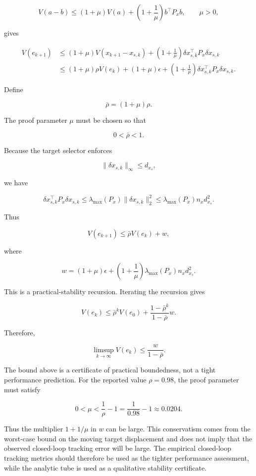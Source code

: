 \documentclass[11pt]{article}
\begin{document}
\[
V(a-b)
\le
(1+\mu)V(a)
+
\left(1+\frac{1}{\mu}\right)b^\top P_x b,
\qquad
\mu>0,
\]

gives


\[
\begin{aligned}
V(e_{k+1})
&\le
(1+\mu)V(x_{k+1}-x_{s,k})
+
\left(1+\frac{1}{\mu}\right)
\delta x_{s,k}^\top P_x \delta x_{s,k} \\
&\le
(1+\mu)\rho V(e_k)
+
(1+\mu)\epsilon
+
\left(1+\frac{1}{\mu}\right)
\delta x_{s,k}^\top P_x \delta x_{s,k}.
\end{aligned}
\]

Define


\[
\bar\rho=(1+\mu)\rho.
\]

The proof parameter $\mu$ must be chosen so that


\[
0<\bar\rho<1.
\]

Because the target selector enforces


\[
\|\delta x_{s,k}\|_\infty
\le
d_{x_s},
\]

we have


\[
\delta x_{s,k}^\top P_x \delta x_{s,k}
\le
\lambda_{\max}(P_x)\|\delta x_{s,k}\|_2^2
\le
\lambda_{\max}(P_x)n_x d_{x_s}^2.
\]

Thus


\[
V(e_{k+1})
\le
\bar\rho V(e_k)+w,
\]

where


\[
w
=
(1+\mu)\epsilon
+
\left(1+\frac{1}{\mu}\right)
\lambda_{\max}(P_x)n_x d_{x_s}^2.
\]

This is a practical-stability recursion. Iterating the recursion gives


\[
V(e_k)
\le
\bar\rho^k V(e_0)
+
\frac{1-\bar\rho^k}{1-\bar\rho}w.
\]

Therefore,


\[
\limsup_{k\to\infty}V(e_k)
\le
\frac{w}{1-\bar\rho}.
\]

The bound above is a certificate of practical boundedness, not a tight performance prediction. For the reported value $\rho=0.98$, the proof parameter must satisfy

\[
0<\mu<\frac{1}{\rho}-1
=
\frac{1}{0.98}-1
\approx 0.0204 .
\]

Thus the multiplier $1+1/\mu$ in $w$ can be large. This conservatism comes from the worst-case bound on the moving target displacement and does not imply that the observed closed-loop tracking error will be large. The empirical closed-loop tracking metrics should therefore be used as the tighter performance assessment, while the analytic tube is used as a qualitative stability certificate.
\end{document}
